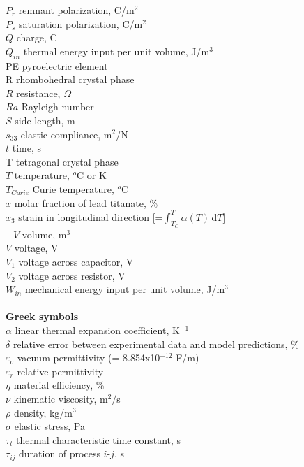 \begin{tabbing}
$P_r$ \> 	  remnant polarization, C/m$^2$\\
$P_s$ \> 	  saturation polarization, C/m$^2$\\
$Q$ \> 	      charge, C \\
$Q_{in}$ \>     thermal energy input per unit volume, J/m$^3$ \\
PE \> 	  pyroelectric element \\
R \>       rhombohedral crystal phase \\
$R$ \> 	      resistance, $\Omega$ \\
$Ra$ \>         Rayleigh number \\
$S$ \>          side length, m \\
$s_{33}$ \>   elastic compliance, m$^{2}$/N \\
$t$ \>        time, s\\
T \>       tetragonal crystal phase \\
$T$ \>        temperature, $^o$C or K\\
$T_{Curie}$ \> Curie temperature, $^o$C\\
$x$ \>	      molar fraction of lead titanate, \%\\
$x_{3}$ \>	  strain in longitudinal direction [=$\int_{T_{C}}^{T} \! \alpha(T) \, \mathrm{d} T$] \\
$-\!\!\!\! V$ \>      volume, m$^3$ \\
$V$\>         voltage, V \\
$V_{1}$\>     voltage across capacitor, V \\
$V_{2}$\>     voltage across resistor, V \\
$W_{in}$ \>     mechanical energy input per unit volume, J/m$^3$ \\
\\

\textbf{Greek symbols} \\
$\alpha$ \>     linear thermal expansion coefficient, K$^{-1}$\\
$\delta$  \>    relative error between experimental data and model predictions, \% \\
$\varepsilon_{o}$  \> vacuum permittivity (= 8.854x10$^{-12}$ F/m) \\
$\varepsilon_{r}$ \>  relative permittivity  \\
$\eta$ \>          material efficiency, \% \\
$\nu$ \>        kinematic viscosity, m$^2$/s \\
$\rho$     \>     density, kg/m$^3$ \\
$\sigma$   \>     elastic stress, Pa \\
$\tau$$_{t}$     \>   thermal characteristic time constant, s\\
$\tau_{ij}$ \>   duration of process $i$-$j$, s\\
\\


\end{tabbing}

